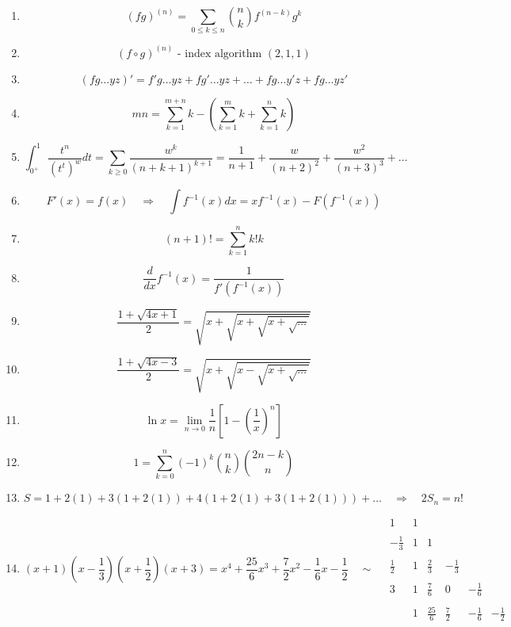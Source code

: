 \documentclass[twoside]{article}
\begin{document}
\begin{enumerate}

\item
$$ (fg)^{(n)}=\sum_{0\le k\le n}{n \choose k}f^{(n-k)}g^k $$

\item
$$ (f\circ g)^{(n)}\mbox{ - index algorithm }(2,1,1) $$

\item
$$ (fg\ldots yz)' = f'g\ldots yz + fg'\ldots yz + \ldots + fg\ldots y'z + fg\ldots yz' $$

\item
$$ mn = \sum_{k=1}^{m+n}k-\left(\sum_{k=1}^m k+\sum_{k=1}^n k\right) $$

\item
$$ \int_{0^+}^1\frac{t^n}{(t^t)^w}dt
	= \sum_{k\ge 0}\frac{w^k}{(n+k+1)^{k+1}}
	= \frac{1}{n+1}+\frac{w}{(n+2)^2}+\frac{w^2}{(n+3)^3}+\ldots $$

\item
$$ F'(x) = f(x) \quad\Longrightarrow\quad \int f^{-1}(x)dx = xf^{-1}(x)-F(f^{-1}(x)) $$

\item
$$ (n+1)! = \sum_{k=1}^n k!k $$

\item
$$ \frac{d}{dx}f^{-1}(x) = \frac{1}{f'(f^{-1}(x))} $$

\item
$$ \frac{1+\sqrt{4x+1}}{2} = \sqrt{x+\sqrt{x+\sqrt{x+\sqrt{\ldots}}}} $$

\item
$$ \frac{1+\sqrt{4x-3}}{2} = \sqrt{x+\sqrt{x-\sqrt{x+\sqrt{\ldots}}}} $$

\item
$$ \ln x = \lim_{n\to 0}\frac{1}{n}\left[1-\left(\frac{1}{x}\right)^n\right] $$

\item
$$ 1 = \sum_{k=0}^n(-1)^k{n \choose k}{2n-k \choose n} $$

\item
$$ S = 1 + 2(1) + 3(1+2(1)) + 4(1+2(1)+3(1+2(1))) + \ldots \quad\Longrightarrow\quad 2S_n=n! $$

\item
$$ \left(x+1\right)\left(x-\frac{1}{3}\right)\left(x+\frac{1}{2}\right)\left(x+3\right)
	= x^4 + \frac{25}{6}x^3  + \frac{7}{2}x^2 - \frac{1}{6}x - \frac{1}{2} \quad\sim\quad
\begin{array}{r|ccccc}
1		& 1 \\
 \\
-\frac{1}{3}	& 1 & 1 \\
 \\
\frac{1}{2}	& 1 & \frac{2}{3} 	& -\frac{1}{3} \\
 \\
3		& 1 & \frac{7}{6} 	& 0			& -\frac{1}{6} \\
 \\
		& 1 & \frac{25}{6} 	& \frac{7}{2}		& -\frac{1}{6}		& -\frac{1}{2}
\end{array} $$


\end{enumerate}
\end{document}
